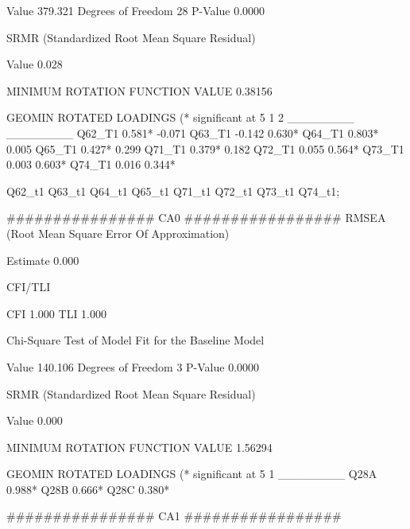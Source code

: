           Value                            379.321
          Degrees of Freedom                    28
          P-Value                           0.0000

SRMR (Standardized Root Mean Square Residual)

          Value                              0.028



MINIMUM ROTATION FUNCTION VALUE       0.38156



           GEOMIN ROTATED LOADINGS (* significant at 5%
                  1             2
              ________      ________
 Q62_T1         0.581*       -0.071
 Q63_T1        -0.142         0.630*
 Q64_T1         0.803*        0.005
 Q65_T1         0.427*        0.299
 Q71_T1         0.379*        0.182
 Q72_T1         0.055         0.564*
 Q73_T1         0.003         0.603*
 Q74_T1         0.016         0.344*


 Q62_t1 Q63_t1 Q64_t1 Q65_t1
 Q71_t1 Q72_t1 Q73_t1 Q74_t1;









 ################
CA0
#################
RMSEA (Root Mean Square Error Of Approximation)

          Estimate                           0.000

CFI/TLI

          CFI                                1.000
          TLI                                1.000

Chi-Square Test of Model Fit for the Baseline Model

          Value                            140.106
          Degrees of Freedom                     3
          P-Value                           0.0000

SRMR (Standardized Root Mean Square Residual)

          Value                              0.000



MINIMUM ROTATION FUNCTION VALUE       1.56294



           GEOMIN ROTATED LOADINGS (* significant at 5%
                  1
              ________
 Q28A           0.988*
 Q28B           0.666*
 Q28C           0.380*


 ################
CA1
#################

